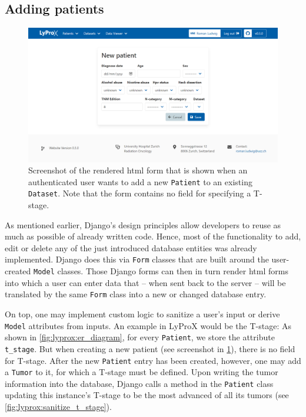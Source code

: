 \documentclass[\relativeRoot/main.tex]{subfiles}
\begin{document}
\subsection*{Adding patients}
\label{subsec:lyprox:implementation:add}

\begin{figure}
    \centering
    \includegraphics[width=1.0\textwidth, frame]{figures/new_patient.png}
    \caption[
        Screenshot of the form for adding new patients
    ]{
        Screenshot of the rendered \acrshort{html} form that is shown when an authenticated user wants to add a new \texttt{Patient} to an existing \texttt{Dataset}. Note that the form contains no field for specifying a T-stage.
    }
    \label{fig:lyprox:new_patient}
\end{figure}

As mentioned earlier, Django's design principles allow developers to reuse as much as possible of already written code. Hence, most of the functionality to add, edit or delete any of the just introduced database entities was already implemented. Django does this via \texttt{Form} classes that are built around the user-created \texttt{Model} classes. Those Django forms can then in turn render \acrshort{html} forms into which a user can enter data that -- when sent back to the server -- will be translated by the same \texttt{Form} class into a new or changed database entry.

On top, one may implement custom logic to sanitize a user's input or derive \texttt{Model} attributes from inputs. An example in LyProX would be the T-stage: As shown in \cref{fig:lyprox:er_diagram}, for every \texttt{Patient}, we store the attribute \texttt{t\_stage}. But when creating a new patient (see screenshot in \cref{fig:lyprox:new_patient}), there is no field for T-stage. After the new \texttt{Patient} entry has been created, however, one may add a \texttt{Tumor} to it, for which a T-stage must be defined. Upon writing the tumor information into the database, Django calls a method in the \texttt{Patient} class updating this instance's T-stage to be the most advanced of all its tumors (see \cref{fig:lyprox:sanitize_t_stage}).
\end{document}
